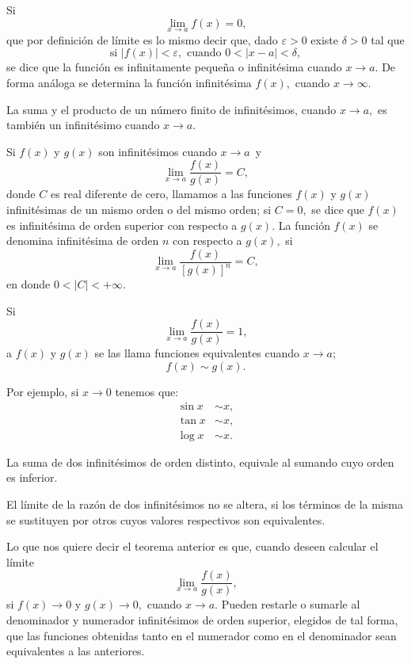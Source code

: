 \begin{definition}
	Si
	\[
	\lim\limits_{x\to a}f(x)=0,
	\]
	que por definici\'on de l\'imite es lo mismo decir que, dado \(\varepsilon>0\) existe \(\delta>0\) tal que
	\[
	\text{si }\left|f(x)\right|<\varepsilon,\text{ cuando }0<\left|x-a\right|<\delta,
	\]
	se dice que la funci\'on es infinitamente peque\~na o infinit\'esima cuando \(x\to a.\) De forma an\'aloga se determina la funci\'on infinit\'esima \(f(x),\) cuando \(x\to\infty.\)\newline
	
\end{definition}

La suma y el producto de un n\'umero finito de infinit\'esimos, cuando \(x\to a,\) es tambi\'en un infinit\'esimo cuando \(x\to a.\)\newline

Si \(f(x)\) y \(g(x)\) son infinit\'esimos cuando \(x\to a\,\) y 
\[\lim\limits_{x\to a}\dfrac{f(x)}{g(x)}=C,
\]
donde \(C\) es real diferente de cero, llamamos a las funciones \(f(x)\) y \(g(x)\) infinit\'esimas de un mismo orden  o del mismo orden; si \(C=0,\) se dice que \(f(x)\) es infinit\'esima de orden superior con respecto a \(g(x).\) La funci\'on \(f(x)\) se denomina  infinit\'esima  de orden \(n\) con respecto a \(g(x),\) si
\[
\lim\limits_{x\to a}\dfrac{f(x)}{\left[g(x)\right]^n}=C,
\]
en donde \(0<\left|C\right|<+\infty.\)\newline

Si
\[
\lim\limits_{x\to a}\dfrac{f(x)}{g(x)}=1,
\]
a \(f(x)\) y \(g(x)\) se las llama funciones equivalentes cuando \(x\to a;\)
\[
f(x)\sim g(x).
\]

Por ejemplo, si \(x\to 0\) tenemos que:
\begin{align*}
\sin x&\sim x,\\
\tan x&\sim x,\\
\log x&\sim x.
\end{align*}

\begin{property}
	La suma de dos infinit\'esimos de orden distinto, equivale al sumando  cuyo orden es inferior.\newline
	
	El l\'imite de la raz\'on  de dos infinit\'esimos no se altera, si los t\'erminos de la misma  se sustituyen por otros cuyos valores respectivos son equivalentes.
\end{property}

Lo que nos quiere decir el teorema anterior es que, cuando deseen calcular el l\'imite 
\[
\lim\limits_{x\to a}\dfrac{f(x)}{g(x)},
\]
si \(f(x)\to 0\) y \(g(x)\to 0,\) cuando \(x\to a.\) Pueden restarle o sumarle al denominador y numerador infinit\'esimos de orden superior, elegidos de tal forma, que las funciones obtenidas tanto en el numerador como en el denominador sean equivalentes a las anteriores.\newline

